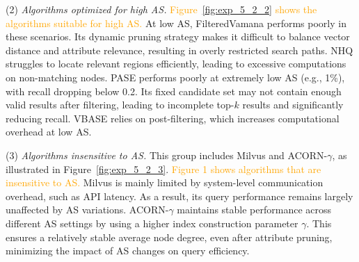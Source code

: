 \documentclass[sigconf, nonacm]{acmart}
\begin{document}
{	\par
	(2) \textit{Algorithms optimized for high AS.}  
	\textcolor{orange}{Figure~\ref{fig:exp_5_2_2} shows the algorithms suitable for high AS.}
	At low AS, FilteredVamana performs poorly in these scenarios. Its dynamic pruning strategy makes it difficult to balance vector distance and attribute relevance, resulting in overly restricted search paths. NHQ struggles to locate relevant regions efficiently, leading to excessive computations on non-matching nodes. 
	 PASE performs poorly at extremely low AS (e.g., 1\%), with recall dropping below 0.2. Its fixed candidate set may not contain enough valid results after filtering, leading to incomplete top-$k$ results and significantly reducing recall. VBASE relies on post-filtering, which increases computational overhead at low AS.
	
	\par
	(3) \textit{Algorithms insensitive to AS.}  
	This group includes Milvus and ACORN-\(\gamma\), as illustrated in Figure~\ref{fig:exp_5_2_3}.
	\textcolor{orange}{Figure 1 shows algorithms that are insensitive to AS.}
	Milvus is mainly limited by system-level communication overhead, such as API latency. As a result, its query performance remains largely unaffected by AS variations. ACORN-\(\gamma\) maintains stable performance across different AS settings by using a higher index construction parameter $\gamma$. This ensures a relatively stable average node degree, even after attribute pruning, minimizing the impact of AS changes on query efficiency.
	
	
	
		
}
\end{document}
